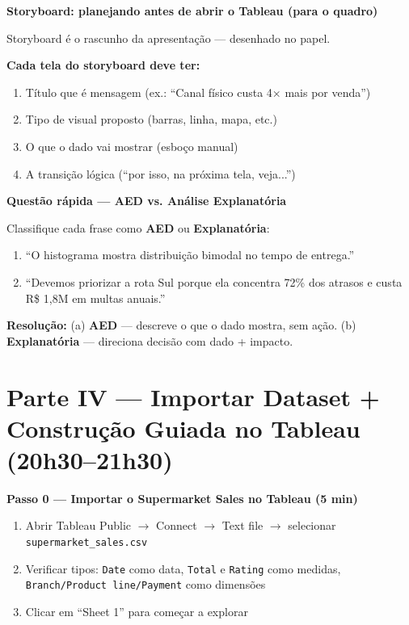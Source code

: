\begin{BoardBox}
\textbf{Storyboard: planejando antes de abrir o Tableau (para o quadro)}

Storyboard é o rascunho da apresentação — desenhado no papel.

\textbf{Cada tela do storyboard deve ter:}
\begin{enumerate}
  \item Título que é mensagem (ex.: ``Canal físico custa 4× mais por venda'')
  \item Tipo de visual proposto (barras, linha, mapa, etc.)
  \item O que o dado vai mostrar (esboço manual)
  \item A transição lógica (``por isso, na próxima tela, veja...'')
\end{enumerate}
\end{BoardBox}

\begin{SolvedBox}
\textbf{Questão rápida — AED vs. Análise Explanatória}

Classifique cada frase como \textbf{AED} ou \textbf{Explanatória}:

\begin{enumerate}[label=\alph*)]
  \item ``O histograma mostra distribuição bimodal no tempo de entrega.''
  \item ``Devemos priorizar a rota Sul porque ela concentra 72\% dos
  atrasos e custa R\$ 1,8M em multas anuais.''
\end{enumerate}

\textbf{Resolução:}
(a) \textbf{AED} — descreve o que o dado mostra, sem ação.
(b) \textbf{Explanatória} — direciona decisão com dado + impacto.
\end{SolvedBox}

\section{Parte IV — Importar Dataset + Construção Guiada no Tableau (20h30–21h30)}

\begin{BoardBox}
\textbf{Passo 0 — Importar o Supermarket Sales no Tableau (5 min)}

\begin{enumerate}
  \item Abrir Tableau Public $\to$ Connect $\to$ Text file $\to$
  selecionar \texttt{supermarket\_sales.csv}
  \item Verificar tipos: \texttt{Date} como data, \texttt{Total} e
  \texttt{Rating} como medidas, \texttt{Branch/Product line/Payment}
  como dimensões
  \item Clicar em ``Sheet 1'' para começar a explorar
\end{enumerate}
\end{BoardBox}

